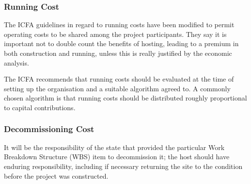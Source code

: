 \subsubsection{Running Cost}

The ICFA guidelines in regard to running costs have been modified to permit operating costs to be shared among the project participants. They say it is important not to double count the benefits of hosting, leading to a premium in both construction and running, unless this is really justified by the economic analysis.

The ICFA recommends that running costs should be evaluated at the time of setting up the organisation and a suitable algorithm agreed to. A commonly chosen algorithm is that running costs should be distributed roughly proportional to capital contributions.
 
\subsubsection{Decommissioning Cost}

It will be the responsibility of the state that provided the particular Work Breakdown Structure (WBS) item to decommission it; the host should have enduring responsibility, including if necessary returning the site to the condition before the project was constructed.